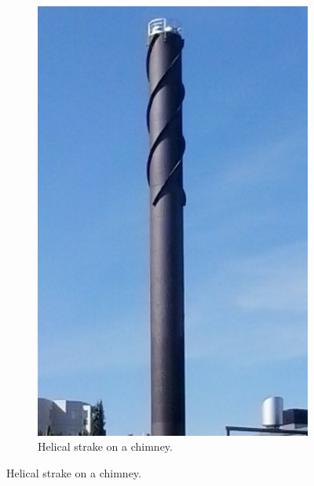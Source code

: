 \documentclass[11pt]{article}
\begin{document}
\begin{figure}[!htb]
\begin{subfigure}[b]{0.45\textwidth}
		\includegraphics[width=\textwidth]{vortex4}
		\caption{Helical strake on a chimney.}
		\label{fig:vortex4}
	\end{subfigure}
\end{figure}






  
\end{document}
